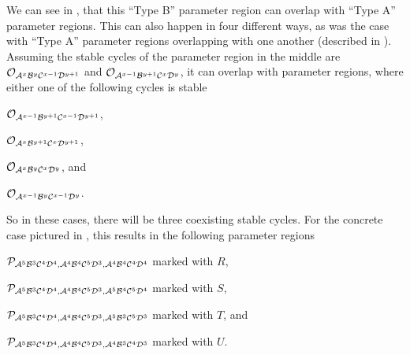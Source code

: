 We can see in , that this ``Type B'' parameter region can overlap with ``Type A'' parameter regions.
This can also happen in four different ways, as was the case with ``Type A'' parameter regions overlapping with one another (described in ).
Assuming the stable cycles of the parameter region in the middle are $\Cycle{\A^x\B^y\C^{x-1}\D^{y+1}}$ and $\Cycle{\A^{x-1}\B^{y+1}\C^x\D^y}$, it can overlap with parameter regions, where either one of the following cycles is stable
\begin{enumerate*}
    \item $\Cycle{\A^{x-1}\B^{y+1}\C^{x-1}\D^{y+1}}$,
    \item $\Cycle{\A^x\B^{y+1}\C^x\D^{y+1}}$,
    \item $\Cycle{\A^x\B^y\C^x\D^y}$, and
    \item $\Cycle{\A^{x-1}\B^y\C^{x-1}\D^y}$.
\end{enumerate*}
So in these cases, there will be three coexisting stable cycles.
For the concrete case pictured in , this results in the following parameter regions
\begin{enumerate*}
    \item $\P_{\A^5\B^3\C^4\D^4, \A^4\B^4\C^5\D^3, \A^4\B^4\C^4\D^4}$ marked with $R$,
    \item $\P_{\A^5\B^3\C^4\D^4, \A^4\B^4\C^5\D^3, \A^5\B^4\C^5\D^4}$ marked with $S$,
    \item $\P_{\A^5\B^3\C^4\D^4, \A^4\B^4\C^5\D^3, \A^5\B^3\C^5\D^3}$ marked with $T$, and
    \item $\P_{\A^5\B^3\C^4\D^4, \A^4\B^4\C^5\D^3, \A^4\B^3\C^4\D^3}$ marked with $U$.
\end{enumerate*}
